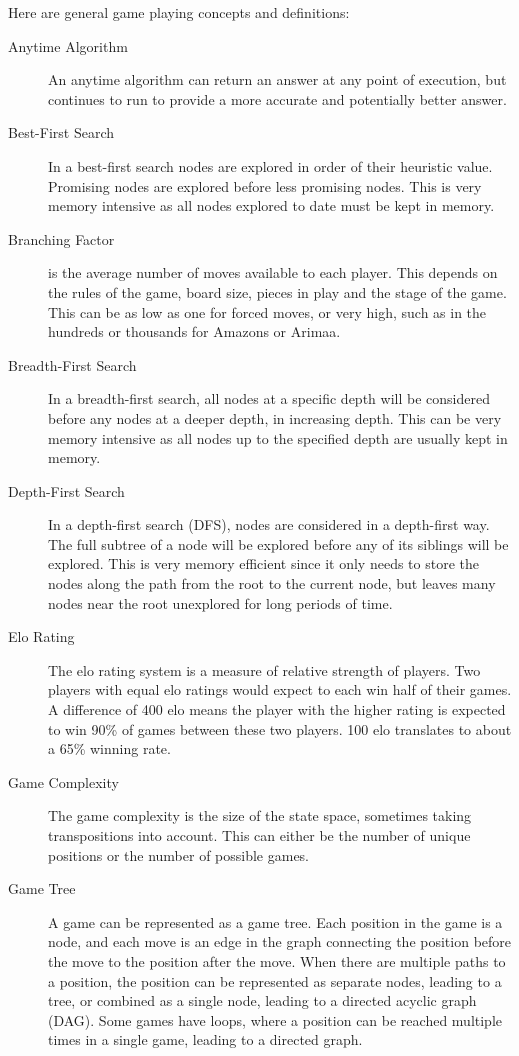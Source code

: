 

Here are general game playing concepts and definitions:

\begin{description}
\item[Anytime Algorithm] An anytime algorithm can return an answer at any point of execution, but continues to run to provide a more accurate and potentially better answer.
\item[Best-First Search] In a best-first search nodes are explored in order of their heuristic value. Promising nodes are explored before less promising nodes. This is very memory intensive as all nodes explored to date must be kept in memory.
\item[Branching Factor] is the average number of moves available to each player. This depends on the rules of the game, board size, pieces in play and the stage of the game. This can be as low as one for forced moves, or very high, such as in the hundreds or thousands for Amazons or Arimaa.
\item[Breadth-First Search] In a breadth-first search, all nodes at a specific depth will be considered before any nodes at a deeper depth, in increasing depth. This can be very memory intensive as all nodes up to the specified depth are usually kept in memory.
\item[Depth-First Search] In a depth-first search (DFS), nodes are considered in a depth-first way. The full subtree of a node will be explored before any of its siblings will be explored. This is very memory efficient since it only needs to store the nodes along the path from the root to the current node, but leaves many nodes near the root unexplored for long periods of time.
\item[Elo Rating] The elo rating system is a measure of relative strength of players. Two players with equal elo ratings would expect to each win half of their games. A difference of 400 elo means the player with the higher rating is expected to win 90\% of games between these two players. 100 elo translates to about a 65\% winning rate.
\item[Game Complexity] The game complexity is the size of the state space, sometimes taking transpositions into account. This can either be the number of unique positions or the number of possible games.
\item[Game Tree] A game can be represented as a game tree. Each position in the game is a node, and each move is an edge in the graph connecting the position before the move to the position after the move. When there are multiple paths to a position, the position can be represented as separate nodes, leading to a tree, or combined as a single node, leading to a directed acyclic graph (DAG). Some games have loops, where a position can be reached multiple times in a single game, leading to a directed graph.

\end{description}
